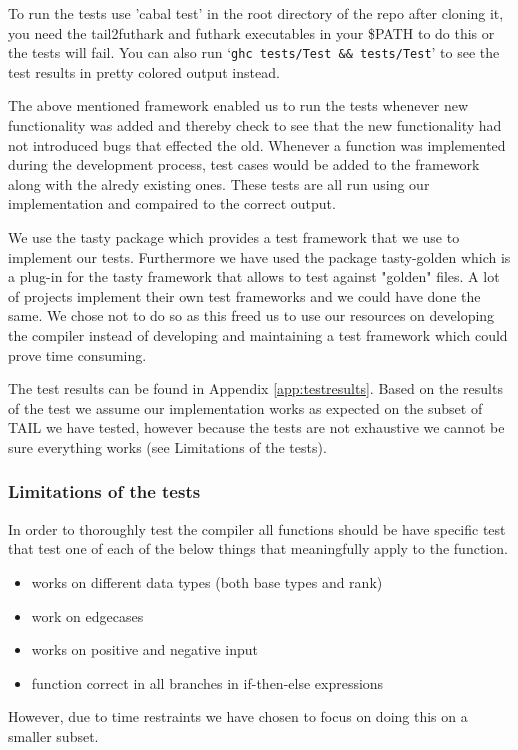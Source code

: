 \documentclass[11pt]{article}
\begin{document}
To run the tests use 'cabal test' in the root directory of the repo after cloning it, you need the tail2futhark and futhark
executables in your \$PATH to do this or the tests will fail. You can also run `{\tt ghc tests/Test \&\& tests/Test}' to see the
test results in pretty colored output instead.

The above mentioned framework enabled us to run the tests whenever new functionality was added and thereby check to see that the new functionality had not introduced bugs that effected the old. 
Whenever a function was implemented during the development process, test cases would be added to the framework along with the alredy existing ones. These tests are all run using our implementation and compaired to the correct output.

We use the tasty package \cite{tasty} which provides a test framework that we use to implement our tests. Furthermore we have used the
package tasty-golden \cite{tasty-golden} which is a plug-in for the tasty framework that allows to test against "golden" files.
A lot of projects implement their own test frameworks and we could have done the same.
We chose not to do so as this freed us to use our resources on developing the compiler instead of developing and maintaining a
test framework which could prove time consuming.

The test results can be found in Appendix \ref{app:testresults}. Based on the results of the test we assume our implementation works as expected on the subset of TAIL we have tested, however because the tests are not exhaustive we cannot be sure everything works (see Limitations of the tests).

\subsubsection{Limitations of the tests}
In order to thoroughly test the compiler all functions should be have specific test that test one of each of the below things
that meaningfully apply to the function. 
\begin{itemize}
\item works on different data types (both base types and rank)
\item work on edgecases
\item works on positive and negative input
\item function correct in all branches in if-then-else expressions
\end{itemize}
However, due to time restraints we have chosen to focus on doing this on a smaller subset. 
\end{document}
